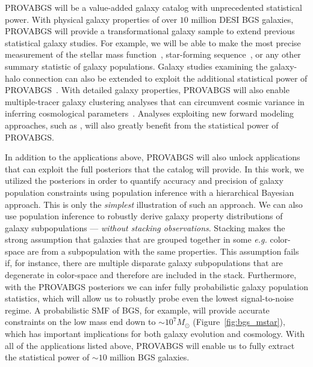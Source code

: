 {\sc PROVABGS} will be a value-added galaxy catalog with unprecedented
statistical power. 
With physical galaxy properties of over $10$ million DESI BGS galaxies, 
{\sc PROVABGS} will provide a transformational galaxy sample to extend
previous statistical galaxy studies. 
For example, we will be able to make the most precise measurement of the
stellar mass function~\citep[SMF]{li2009, moustakas2013}, star-forming
sequence~\citep{noeske2007}, or any other summary statistic of galaxy
populations. 
Galaxy studies examining the galaxy-halo connection can also be extended to
exploit the additional statistical power of {\sc
PROVABGS}~\citep[\emph{e.g.}][]{tinker2011, wetzel2013, zu2015, hahn2017,
hahn2019b}. 
With detailed galaxy properties, {\sc PROVABGS} will also enable
multiple-tracer galaxy clustering analyses that can circumvent cosmic variance
in inferring cosmological parameters~\citep{seljak2009, mcdonald2009,
wang2020}.
Analyses exploiting new forward modeling approaches, such as \cite{hahn2021},
will also greatly benefit from the statistical power of {\sc PROVABGS}.

In addition to the applications above, {\sc PROVABGS} will also unlock
applications that can exploit the full posteriors that the catalog will
provide. 
In this work, we utilized the posteriors in order to quantify accuracy and
precision of galaxy population constraints using population inference with a
hierarchical Bayesian approach. 
This is only the \emph{simplest} illustration of such an approach. 
We can also use population inference to robustly derive galaxy property
distributions of galaxy subpopulations --- \emph{without stacking observations}.
Stacking makes the strong assumption that galaxies that are grouped together in
some \emph{e.g.} color-space are from a subpopulation with the same properties. 
This assumption fails if, for instance, there are multiple disparate galaxy
subpopulations that are degenerate in color-space and therefore are included in
the stack. 
Furthermore, with the {\sc PROVABGS} posteriors we can infer fully
probabilistic galaxy population statistics, which will allow us to robustly
probe even the lowest signal-to-noise regime.
A probabilistic SMF of BGS, for example, will provide accurate constraints on
the low mass end down to ${\sim}10^{7} M_\odot$ (Figure~\ref{fig:bgs_mstar}),
which has important implications for both galaxy evolution and cosmology. 
With all of the applications listed above, {\sc PROVABGS} will enable us to
fully extract the statistical power of ${\sim}10$ million BGS galaxies.
